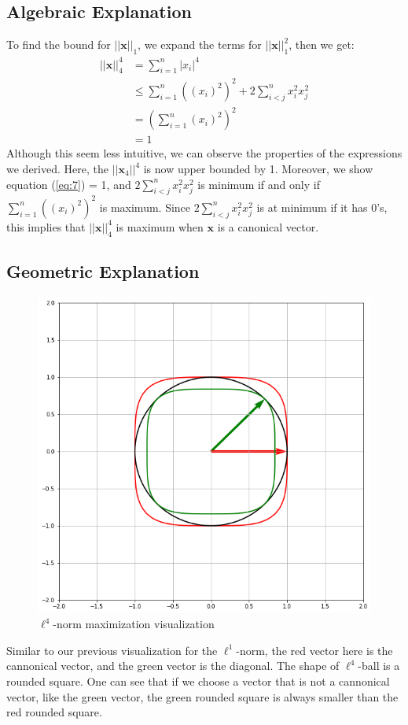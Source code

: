 \documentclass[11pt]{article}
\begin{document}
\subsection{Algebraic Explanation}
	To find the bound for $||\bm{x}||_1$, we expand the terms for $||\bm{x}||_1^2$, then we get:
	\begin{align}
    	||\bm{x}||_4^4 
    		&= \sum^{n}_{i=1} |x_{i}|^{4} \\
			&\leq \sum^{n}_{i=1} ((x_{i})^{2})^{2} + 2\sum^{n}_{i<j} x_{i}^{2}x_{j}^{2}\label{eq:7}\\
			&= (\sum^{n}_{i=1} (x_{i})^2)^{2} \\
			&= 1
	\end{align}
	Although this seem less intuitive, we can observe the properties of the expressions we derived. Here, the $||\bm{x}_{4}||^{4}$
	is now upper bounded by 1. Moreover, we show equation (\ref{eq:7}) = 1, and $2\sum^{n}_{i<j} x_{i}^{2}x_{j}^{2}$
	is minimum if and only if $\sum^{n}_{i=1} ((x_{i})^{2})^{2}$ is maximum. Since $2\sum^{n}_{i<j} x_{i}^{2}x_{j}^{2}$ is at minimum 
	if it has 0's, this implies that $||\bm{x}||_4^4$ is maximum when $\bm{x}$ is a canonical vector. 
	

\subsection{Geometric Explanation}
    \begin{figure}[h]
        \centering
        \includegraphics[scale=0.4]{l4norm_bound.png}
        \caption{$\ell^{4}$-norm maximization visualization}
        \label{fig:l4_bound}
    \end{figure}
    Similar to our previous visualization for the $\ell^{1}$-norm, the red vector here is the cannonical vector, and the green 
    vector is the diagonal. The shape of $\ell^{4}$-ball is a rounded square. One can see that if we choose a vector that is not 
    a cannonical vector, like the green vector, the green rounded square is always smaller than the red rounded square. 
    
\end{document}
